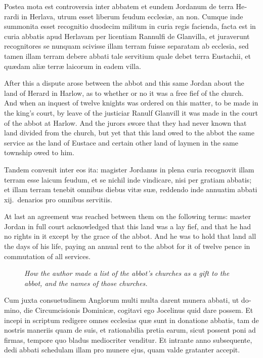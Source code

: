 \documentclass[10pt]{book}
\newcommand{\blockhead}[4][]{
\begin{figure}
\centering
\vspace{#4}
\parbox{2.75cm}{\begin{center}\footnotesize \color{BrickRed} \emph{#2}\\ #1 \end{center}}
\end{figure}
}
\begin{document}
\begin{paracol}{2}
\switchcolumn*

\begin{otherlanguage}{latin}
Postea mota est controversia inter abbatem et eundem Jordanum de terra Herardi in Herlava, utrum esset liberum feudum ecclesi\ae{}, an non. Cumque inde summonita esset recognitio duodecim militum in curia regis facienda, facta est in curia abbatis apud Herlavam per licentiam Rannulfi de Glanvilla, et juraverunt recognitores se nunquam scivisse illam terram fuisse separatam ab ecclesia, sed tamen illam terram debere abbati tale servitium quale debet terra Eustachii, et qu\ae{}dam ali\ae{} terr\ae{} laicorum in eadem villa. 
\end{otherlanguage}

\switchcolumn

After this a dispute arose between the abbot and this same Jordan about the land of Herard in Harlow, as to whether or no it was a free fief of the church. And when an inquest of twelve knights was ordered on this matter, to be made in the king's court, by leave of the justiciar Ranulf Glanvill it was made in the court of the abbot at Harlow. And the jurors swore that they had never known that land divided from the church, but yet that this land owed to the abbot the same service as the land of Eustace and certain other land of laymen in the same township owed to him.

\switchcolumn*

\begin{otherlanguage}{latin}
Tandem convenit inter eos ita: magister Jordanus in plena curia recognovit illam terram esse laicum feudum, et se nichil inde vindicare, nisi per gratiam abbatis; et illam terram tenebit omnibus diebus vit\ae{} su\ae{}, reddendo inde annuatim abbati xij.\ denarios pro omnibus servitiis.
\end{otherlanguage}

\switchcolumn

At last an agreement was reached between them on the following terms: master Jordan in full court acknowledged that this land was a lay fief, and that he had no rights in it except by the grace of the abbot. And he was to hold that land all the days of his life, paying an annual rent to the abbot for it of twelve pence in commutation of all services.

\switchcolumn*

\begin{otherlanguage}{latin}
\blockhead{How the author made a list of the abbot's churches as a gift to the abbot, and the names of those churches.}{4}{-.65cm}
Cum juxta consuetudinem Anglorum multi multa darent munera abbati, ut domino, die Circumcisionis Dominic\ae{}, cogitavi ego Jocelinus quid dare possem. Et incepi in scriptum redigere omnes ecclesias qu\ae{} sunt in donatione abbatis, tam de nostris maneriis  quam de suis, et rationabilia pretia earum, sicut possent poni ad firmas, tempore quo bladus mediocriter venditur. Et intrante anno subsequente, dedi abbati schedulam illam pro munere ejus, quam valde gratanter accepit.


\end{otherlanguage}
\end{paracol}
\end{document}
